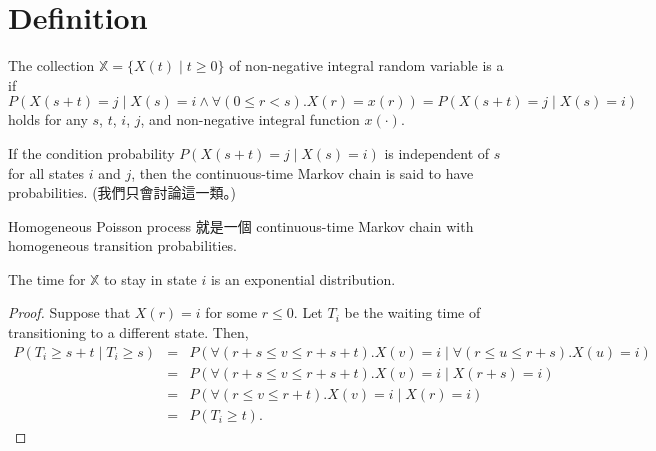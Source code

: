 \section{Definition}

\begin{definition}
The collection $ \mathbb{X} = \{ X(t) \mid t \ge 0 \} $ of non-negative integral random variable is a  if
\[ P(X(s + t) = j \mid X(s) = i \wedge \forall(0 \le r < s) .X(r) = x(r)) = P(X(s + t) = j \mid X(s) = i) \]
holds for any $ s $, $ t $, $ i $, $ j $, and non-negative integral function $ x(\cdot) $.
\begin{comment}
Non-homogeneous Poisson process with intensity function $ \lambda(\cdot) $ is a continuous-time Markov chain given $ \mathbb{N}(s) = n $, the number of events in time $ [s, s + t] $ is a Poisson distribution with parameter
\[ \int_{s}^{s + t} \lambda(x) \mathrm{d}x, \]
having nothing to do with $ N(s - \epsilon) $ for all $ \epsilon \le 0 $.
\end{comment}
\end{definition}

\begin{definition}
If the condition probability $ P(X(s + t) = j \mid X(s) = i) $ is independent of $ s $ for all states $ i $ and $ j $, then the continuous-time Markov chain is said to have  probabilities. (我們只會討論這一類。)
\end{definition}

\begin{example}
Homogeneous Poisson process 就是一個 continuous-time Markov chain with homogeneous transition probabilities.
\end{example}

\begin{observation}
The time for $ \mathbb{X} $ to stay in state $ i $ is an exponential distribution.
\begin{proof}
Suppose that $ X(r) = i $ for some $ r \le 0 $.
Let $ T_{i} $ be the waiting time of transitioning to a different state. Then,
\begin{eqnarray*}
P(T_{i} \ge s + t \mid T_{i} \ge s)
  & = & P(\forall(r + s \le v \le r + s + t).X(v) = i \mid \forall(r \le u \le r + s).X(u) = i) \\
  & = & P(\forall(r + s \le v \le r + s + t).X(v) = i \mid X(r + s) = i) \\
  & = & P(\forall(r \le v \le r + t).X(v) = i \mid X(r) = i) \\
  & = & P(T_{i} \ge t).
\end{eqnarray*}
\end{proof}
\begin{comment}
我們稱這個 exponential distribution 的參數為 $ \lambda_{i} $.
\end{comment}
\end{observation}

